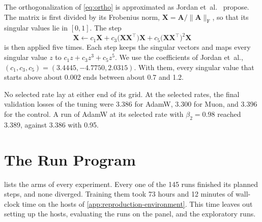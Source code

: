 The orthogonalization of \cref{eq:ortho} is approximated as Jordan et~al.~\cite{jordan2024muon} propose. The matrix is first divided by its Frobenius norm, $\mathbf{X} = \mathbf{A} / \lVert \mathbf{A} \rVert_{\mathrm{F}}$, so that its singular values lie in $[0, 1]$. The step
\begin{equation}[eq:newton-schulz]{}
  \mathbf{X} \leftarrow c_1 \mathbf{X} + c_3 \bigl( \mathbf{X} \mathbf{X}^{\top} \bigr) \mathbf{X} + c_5 \bigl( \mathbf{X} \mathbf{X}^{\top} \bigr)^{2} \mathbf{X}
\end{equation}
is then applied five times. Each step keeps the singular vectors and maps every singular value $z$ to $c_1 z + c_3 z^3 + c_5 z^5$. We use the coefficients of Jordan et~al., $(c_1, c_3, c_5) = (3.4445, -4.7750, 2.0315)$. With them, every singular value that starts above about 0.002 ends between about 0.7 and 1.2.

No selected rate lay at either end of its grid. At the selected rates, the final validation losses of the tuning were 3.386 for AdamW, 3.300 for Muon, and 3.396 for the control. A run of AdamW at its selected rate with $\beta_2 = 0.98$ reached 3.389, against 3.386 with 0.95.

\section{The Run Program}
\label{app:configuration-program}
 lists the arms of every experiment. Every one of the 145 runs finished its planned steps, and none diverged. Training them took 73 hours and 12 minutes of wall-clock time on the hosts of \cref{app:reproduction-environment}. This time leaves out setting up the hosts, evaluating the runs on the panel, and the exploratory runs.

